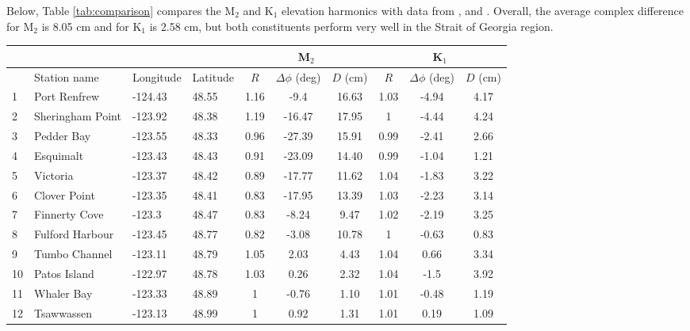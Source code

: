 \documentclass[letterpaper]{tATO2e}
\begin{document}
Below, Table \ref{tab:comparison} compares the M$_2$ and K$_1$ elevation harmonics with data from \citet{foreman1995tidal}, \citet{foreman2004m} and \citet{foreman2012circulation}. Overall, the average complex difference for M$_2$ is 8.05 cm and for K$_1$ is 2.58 cm, but both constituents perform very well in the Strait of Georgia region. 

\begin{table}[h]
\centering 
{}
{\begin{tabular}{l l l l c c c c c c} 
\hline 
& & & & \multicolumn{3}{c}{M$_2$} & \multicolumn{3}{c}{K$_1$} \\ 
\hline 
            & Station name     & Longitude & Latitude & $R$ & $ \Delta \phi$ (deg) & $D$ (cm) & $R$ & $ \Delta \phi$ (deg) & $D$ (cm) \\
\hline 
1 & Port Renfrew & -124.43 & 48.55 & 1.16 & -9.4 & 16.63  & 1.03 & -4.94 & 4.17 \\
2 & Sheringham Point & -123.92 & 48.38 & 1.19 & -16.47 & 17.95  & 1 & -4.44 & 4.24 \\
3 & Pedder Bay & -123.55 & 48.33 & 0.96 & -27.39 & 15.91  & 0.99 & -2.41 & 2.66 \\
4 & Esquimalt & -123.43 & 48.43 & 0.91 & -23.09 & 14.40  & 0.99 & -1.04 & 1.21 \\
5 & Victoria & -123.37 & 48.42 & 0.89 & -17.77 & 11.62  & 1.04 & -1.83 & 3.22 \\
6 & Clover Point & -123.35 & 48.41 & 0.83 & -17.95 & 13.39  & 1.03 & -2.23 & 3.14 \\
7 & Finnerty Cove & -123.3 & 48.47 & 0.83 & -8.24 & 9.47  & 1.02 & -2.19 & 3.25 \\
8 & Fulford Harbour & -123.45 & 48.77 & 0.82 & -3.08 & 10.78  & 1 & -0.63 & 0.83 \\
9 & Tumbo Channel & -123.11 & 48.79 & 1.05 & 2.03 & 4.43  & 1.04 & 0.66 & 3.34 \\
10 & Patos Island & -122.97 & 48.78 & 1.03 & 0.26 & 2.32  & 1.04 & -1.5 & 3.92 \\
11 & Whaler Bay & -123.33 & 48.89 & 1 & -0.76 & 1.10  & 1.01 & -0.48 & 1.19 \\
12 & Tsawwassen & -123.13 & 48.99 & 1 & 0.92 & 1.31  & 1.01 & 0.19 & 1.09 \\

\end{tabular}}
\end{table}
\end{document}
